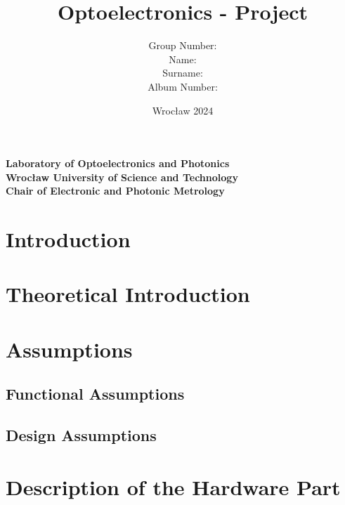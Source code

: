\documentclass[12pt]{article}
\begin{document}
	
	\title{\textbf{Optoelectronics - Project}}
	\author{Group Number: \\ Name: \\ Surname: \\ Album Number: }
	\date{Wrocław 2024}
	\maketitle
	
	\begin{center}
		\textbf{Laboratory of Optoelectronics and Photonics} \\
		\textbf{Wrocław University of Science and Technology} \\
		\textbf{Chair of Electronic and Photonic Metrology}
	\end{center}
	
	\newpage
	\tableofcontents
	\newpage
	
	\section{Introduction}
	
	\section{Theoretical Introduction}
	
	\section{Assumptions}
	\subsection{Functional Assumptions}
	\subsection{Design Assumptions}
	
	\section{Description of the Hardware Part}
	
\end{document}
